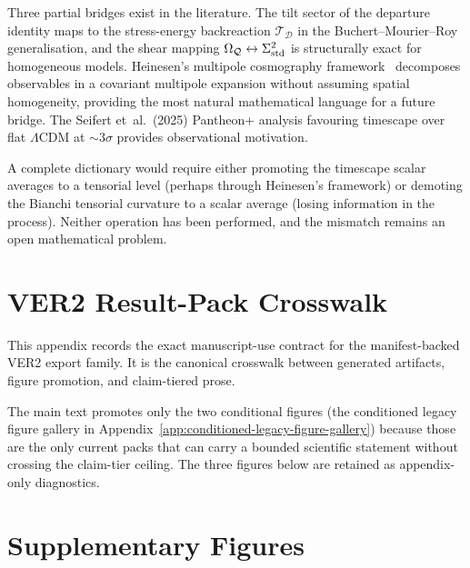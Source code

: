Three partial bridges exist in the literature.
The tilt sector of the departure identity maps to the
stress-energy backreaction $\mathcal{T}_{\mathcal{D}}$ in
the Buchert--Mourier--Roy generalisation, and the shear
mapping $\Omega_{\mathcal{Q}} \leftrightarrow \Sigma^2_{\mathrm{std}}$ is
structurally exact for homogeneous models.  Heinesen's
multipole cosmography framework~\cite{Heinesen2021}
decomposes observables in a covariant multipole expansion
without assuming spatial homogeneity, providing the most
natural mathematical language for a future bridge.  The
Seifert et~al.\ (2025) Pantheon+ analysis favouring
timescape over flat $\Lambda$CDM at $\sim\!3\sigma$
provides observational motivation.

A complete dictionary would require either promoting the
timescape scalar averages to a tensorial level (perhaps
through Heinesen's framework) or demoting the Bianchi
tensorial curvature to a scalar average (losing information
in the process).  Neither operation has been performed, and
the mismatch remains an open mathematical problem.


\chapter{VER2 Result-Pack Crosswalk}
\label{app:ver2-crosswalk}

This appendix records the exact manuscript-use contract for the
manifest-backed VER2 export family.  It is the canonical crosswalk
between generated artifacts, figure promotion, and claim-tiered prose.





The main text promotes only the two conditional figures
(the conditioned legacy figure gallery in Appendix~\ref{app:conditioned-legacy-figure-gallery}) because those are the only
current packs that can carry a bounded scientific statement without
crossing the claim-tier ceiling.  The three figures below are retained
as appendix-only diagnostics.

\clearpage



\chapter{Supplementary Figures}
\label{app:supp-figures}

